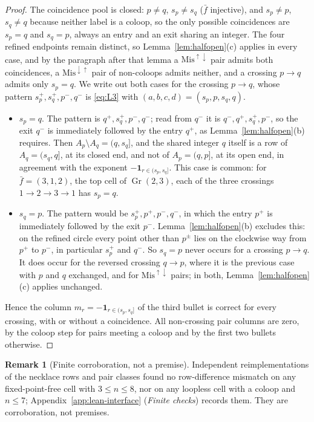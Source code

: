 \documentclass[11pt]{article}
\theoremstyle{definition}
\newtheorem{remark}[theorem]{Remark}
\DeclareMathOperator{\Gr}{Gr}
\newcommand{\ba}{\bar f}
\begin{document}
\begin{proof}
The coincidence pool is closed: $p\ne q$, $s_p\ne s_q$ ($\ba$ injective), and $s_p\ne p$, $s_q\ne q$
because neither label is a coloop, so the only possible coincidences are $s_p=q$ and $s_q=p$, always
an entry and an exit sharing an integer. The four refined endpoints remain distinct, so
Lemma~\ref{lem:halfopen}(c) applies in every case, and by the paragraph after that lemma a
$\mathrm{Mis}^{\uparrow\downarrow}$ pair admits both coincidences, a $\mathrm{Mis}^{\downarrow\uparrow}$
pair of non-coloops admits neither, and a crossing $p\to q$ admits only $s_p=q$. We write out both
cases for the crossing $p\to q$, whose pattern $s_p^+,s_q^+,p^-,q^-$ is \eqref{eq:L3} with
$(a,b,c,d)=(s_p,p,s_q,q)$.
\begin{itemize}
\item $s_p=q$. The pattern is $q^+,s_q^+,p^-,q^-$; read from $q^-$ it is $q^-,q^+,s_q^+,p^-$, so the exit
$q^-$ is immediately followed by the entry $q^+$, as Lemma~\ref{lem:halfopen}(b) requires. Then
$A_p\setminus A_q=(q,s_q]$, and the shared integer $q$ itself is a row of $A_q=(s_q,q]$, at its closed
end, and not of $A_p=(q,p]$, at its open end, in agreement with the exponent
$-\mathbf 1_{r\in(s_p,s_q]}$. This case is common: for $\ba=(3,1,2)$, the top cell of $\Gr(2,3)$, each
of the three crossings $1\to2\to3\to1$ has $s_p=q$.
\item $s_q=p$. The pattern would be $s_p^+,p^+,p^-,q^-$, in which the entry $p^+$ is immediately
followed by the exit $p^-$. Lemma~\ref{lem:halfopen}(b) excludes this: on the refined circle every point
other than $p^\pm$ lies on the clockwise way from $p^+$ to $p^-$, in particular $s_p^+$ and $q^-$. So
$s_q=p$ never occurs for a crossing $p\to q$. It does occur for the reversed crossing $q\to p$, where
it is the previous case with $p$ and $q$ exchanged, and for $\mathrm{Mis}^{\uparrow\downarrow}$ pairs;
in both, Lemma~\ref{lem:halfopen}(c) applies unchanged.
\end{itemize}
Hence the column $m_r=-\mathbf 1_{r\in(s_p,s_q]}$ of the third bullet is correct for every crossing,
with or without a coincidence.
All non-crossing pair columns are zero, by the coloop step for pairs meeting a coloop and by the first two
bullets otherwise.
\end{proof}



\begin{remark}[Finite corroboration, not a premise]\label{rem:finite-corroboration}
Independent reimplementations of the necklace rows and pair classes found no row-difference mismatch on
any fixed-point-free cell with $3\le n\le8$, nor on any loopless cell with a coloop and $n\le7$;
Appendix~\ref{app:lean-interface} (\emph{Finite checks}) records them. They are corroboration, not
premises.
\end{remark}
\end{document}
